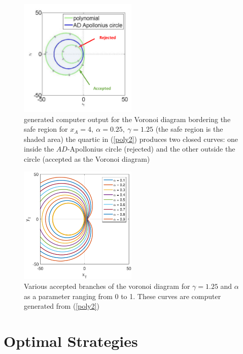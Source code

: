 \documentclass{beamer}
\begin{document}
\begin{frame}
\begin{figure}[htb]
\centering
\includegraphics[width=0.5\textwidth]{fig/g_1p25.pdf}
\caption{generated computer output for the Voronoi diagram bordering the safe region for $x_A=4,\ \alpha=0.25,\ \gamma=1.25$ (the safe region is the shaded area) the quartic in (\ref{poly2}) produces two closed curves: one inside the $AD$-Apollonius circle (rejected) and the other outside the circle (accepted as the Voronoi diagram)}
\label{gamma=1.25}
\end{figure}
\end{frame}
\begin{frame}
\begin{figure}[htb]
\centering
\includegraphics[width=0.5\textwidth]{fig/VAR_alpha_g_1p25.pdf}
\caption{Various accepted branches of the voronoi diagram for $\gamma=1.25$ and $\alpha$ as a parameter ranging from 0 to 1. These curves are computer generated from (\ref{poly2})}
\label{VAR_alpha_gamma=1.25}
\end{figure}
\end{frame}

\section{Optimal Strategies}
\end{document}
